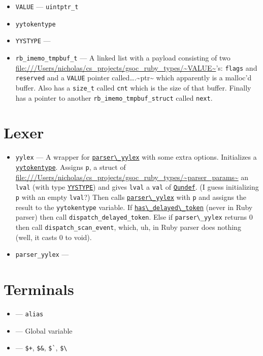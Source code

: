 \documentclass[11pt]{article}
\begin{document}
\begin{itemize}
\item \label{VALUE} \verb~VALUE~ --- \verb~uintptr_t~
\item \label{yytokentype} \verb~yytokentype~
\item \label{YYSTYPE} \verb~YYSTYPE~ ---
\item \label{rb_imemo_tmpbuf_t} \verb~rb_imemo_tmpbuf_t~ --- A linked list with a payload consisting of
two \url{file:///Users/nicholas/cs_projects/gsoc_ruby_types/~VALUE~}'s: \verb~flags~ and \verb~reserved~ and a \verb~VALUE~ pointer
called\ldots{}.\textasciitilde{}ptr\textasciitilde{} which apparently is a malloc'd buffer. Also has a
\verb~size_t~ called \verb~cnt~ which is the size of that buffer. Finally has
a pointer to another \verb~rb_imemo_tmpbuf_struct~ called \verb~next~.
\end{itemize}

\section{Lexer}
\label{sec-5}

\begin{itemize}
\item \label{yylex} \verb~yylex~ --- A wrapper for \hyperref[parser_yylex]{\verb~parser\_yylex~} with some extra
options. Initializes a \hyperref[yytokentype]{\verb~yytokentype~}. Assigns \verb~p~, a struct of
\url{file:///Users/nicholas/cs_projects/gsoc_ruby_types/~parser\_params~} an \texttt{\verb~lval~} (with type \hyperref[YYSTYPE]{\verb~YYSTYPE~}) and gives \verb~lval~ a
\verb~val~ of \hyperref[Qundef]{\verb~Qundef~}. (I guess initializing \verb~p~ with an empty \verb~lval~?)
Then calls \hyperref[parser_yylex]{\verb~parser\_yylex~} with \verb~p~ and assigns the result to the
\verb~yytokentype~ variable. If \hyperref[has_delayed_token]{\verb~has\_delayed\_token~} (never in Ruby
parser) then call \verb~dispatch_delayed_token~. Else if \verb~parser\_yylex~
returns 0 then call \verb~dispatch_scan_event~, which, uh, in Ruby parser
does nothing (well, it casts 0 to void).
\item \label{parser_yylex} \verb~parser_yylex~ ---
\end{itemize}

\section{Terminals}
\label{sec-6}
\begin{itemize}
\item \label{kALIAS} --- \verb~alias~
\item \label{tGVAR} --- Global variable
\item \label{tBACK_REF} --- \verb~$+~, \verb~$&~, \verb~$`~, \verb~$\~
\end{itemize}
\end{document}
